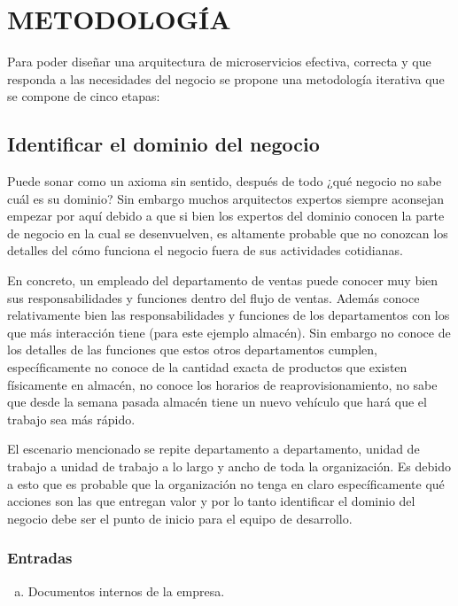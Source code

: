 \section{METODOLOGÍA}

Para poder diseñar una arquitectura de microservicios efectiva, correcta y que responda a las
necesidades del negocio se propone una metodología iterativa que se compone de cinco etapas:


\subsection{Identificar el dominio del negocio}

Puede sonar como un axioma sin sentido, después de todo ¿qué negocio no sabe cuál es su dominio?
Sin embargo muchos arquitectos expertos siempre aconsejan empezar por aquí debido a que si bien los
expertos del dominio conocen la parte de negocio en la cual se desenvuelven, es altamente probable
que no conozcan los detalles del cómo funciona el negocio fuera de sus actividades cotidianas.

En concreto, un empleado del departamento de ventas puede conocer muy bien sus responsabilidades
y funciones dentro del flujo de ventas.
Además conoce relativamente bien las responsabilidades y funciones de los departamentos con los que más
interacción tiene (para este ejemplo almacén).
Sin embargo no conoce de los detalles de las funciones que estos otros departamentos cumplen, específicamente
no conoce de la cantidad exacta de productos que existen físicamente en almacén, no conoce los horarios
de reaprovisionamiento, no sabe que desde la semana pasada almacén tiene un nuevo vehículo que hará que
el trabajo sea más rápido.

El escenario mencionado se repite departamento a departamento, unidad de trabajo a unidad de trabajo
a lo largo y ancho de toda la organización.
Es debido a esto que es probable que la organización no tenga en claro específicamente qué acciones
son las que entregan valor y por lo tanto identificar el dominio del negocio debe ser el punto de inicio
para el equipo de desarrollo.

\subsubsection*{Entradas}
\begin{enumerate}[a.]
	\item Documentos internos de la empresa.
\end{enumerate}

